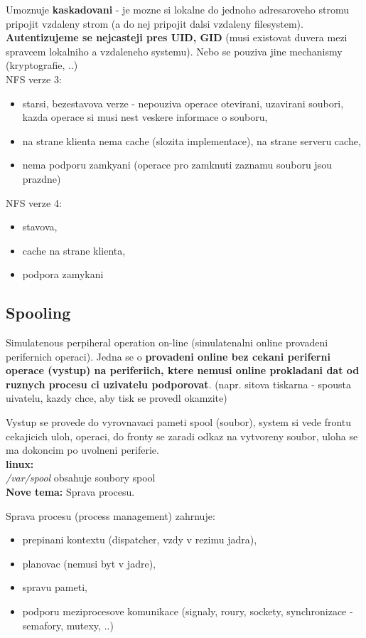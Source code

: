 \documentclass[a4paper, 11pt]{article}
\begin{document}
Umoznuje \textbf{kaskadovani} - je mozne si lokalne do jednoho adresaroveho stromu pripojit vzdaleny strom (a do nej pripojit dalsi vzdaleny filesystem). \textbf{Autentizujeme se nejcasteji pres UID, GID} (musi existovat duvera mezi spravcem lokalniho a vzdaleneho systemu). Nebo se pouziva jine mechanismy (kryptografie, ..) \\

NFS verze 3:
\begin{itemize}
    \item starsi, bezestavova verze - nepouziva operace otevirani, uzavirani soubori, kazda operace si musi nest veskere informace o souboru,
    \item na strane klienta nema cache (slozita implementace), na strane serveru cache,
    \item nema podporu zamkyani (operace pro zamknuti zaznamu souboru jsou prazdne) \\
\end{itemize}

NFS verze 4:
\begin{itemize}
    \item stavova,
    \item cache na strane klienta,
    \item podpora zamykani \\
\end{itemize}

\subsection{Spooling}
Simulatenous perpiheral operation on-line (simulatenalni online provadeni perifernich operaci). Jedna se o \textbf{provadeni online bez cekani periferni operace (vystup) na periferiich, ktere nemusi online prokladani dat od ruznych procesu ci uzivatelu podporovat}. (napr. sitova tiskarna - spousta uivatelu, kazdy chce, aby tisk se provedl okamzite)

Vystup se provede do vyrovnavaci pameti spool (soubor), system si vede frontu cekajicich uloh, operaci, do fronty se zaradi odkaz na vytvoreny soubor, uloha se ma dokoncim po uvolneni periferie. \\

\textbf{linux:} \\[0.5em]
\textit{/var/spool} obsahuje soubory spool \\

\newpage
\textbf{Nove tema:} Sprava procesu.

Sprava procesu (process management) zahrnuje: \label{procesy-detailed}
\begin{itemize}
    \item prepinani kontextu (dispatcher, vzdy v rezimu jadra),
    \item planovac (nemusi byt v jadre),
    \item spravu pameti,
    \item podporu meziprocesove komunikace (signaly, roury, sockety, synchronizace - semafory, mutexy, ..) \\
\end{itemize}
\end{document}
